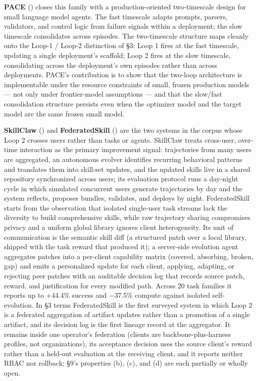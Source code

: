 \documentclass[
]{article}
\begin{document}
\textbf{PACE} () closes
this family with a production-oriented two-timescale design for small
language model agents. The fast timescale adapts prompts, parsers,
validators, and control logic from failure signals within a deployment;
the slow timescale consolidates across episodes. The two-timescale
structure maps cleanly onto the Loop-1 / Loop-2 distinction of §3: Loop
1 fires at the fast timescale, updating a single deployment's scaffold;
Loop 2 fires at the slow timescale, consolidating across the
deployment's own episodes rather than across deployments. PACE's
contribution is to show that the two-loop architecture is implementable
under the resource constraints of small, frozen production models ---
not only under frontier-model assumptions --- and that the slow/fast
consolidation structure persists even when the optimizer model and the
target model are the same frozen small model.

\textbf{SkillClaw} () and
\textbf{FederatedSkill} () are the two systems in the corpus whose Loop 2 crosses
users rather than tasks or agents. SkillClaw treats cross-user,
over-time interaction as the primary improvement signal: trajectories
from many users are aggregated, an autonomous evolver identifies
recurring behavioral patterns and translates them into skill-set
updates, and the updated skills live in a shared repository synchronized
across users; its evaluation protocol runs a day-night cycle in which
simulated concurrent users generate trajectories by day and the system
reflects, proposes bundles, validates, and deploys by night.
FederatedSkill starts from the observation that isolated single-user
task streams lack the diversity to build comprehensive skills, while raw
trajectory sharing compromises privacy and a uniform global library
ignores client heterogeneity. Its unit of communication is the semantic
skill diff (a structured patch over a local library, shipped with the
task reward that produced it); a server-side evolution agent aggregates
patches into a per-client capability matrix (covered, absorbing, broken,
gap) and emits a personalized update for each client, applying,
adapting, or rejecting peer patches with an auditable decision log that
records source patch, reward, and justification for every modified path.
Across 20 task families it reports up to +44.4\% success and −37.5\%
compute against isolated self-evolution. In §3 terms FederatedSkill is
the first surveyed system in which Loop 2 is a federated aggregation of
artifact updates rather than a promotion of a single artifact, and its
decision log is the first lineage record at the aggregator. It remains
inside one operator's federation (clients are backbone-plus-harness
profiles, not organizations), its acceptance decision uses the source
client's reward rather than a held-out evaluation at the receiving
client, and it reports neither RBAC nor rollback; §9's properties (b),
(c), and (d) are each partially or wholly open.
\end{document}
